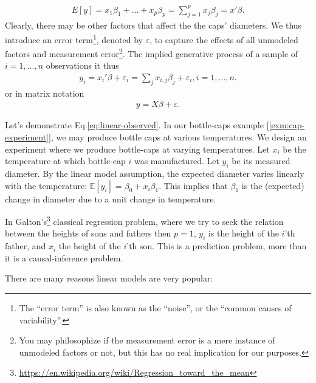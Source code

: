 \documentclass[]{book}
\renewcommand{\href}[2]{#2\footnote{\url{#1}}}
\theoremstyle{definition}
\theoremstyle{definition}
\theoremstyle{definition}
\theoremstyle{remark}
\let\BeginKnitrBlock\begin \let\EndKnitrBlock\end
\begin{document}
\begin{align}
  E[y]=x_1 \beta_1 + \dots + x_p \beta_p = \sum_{j=1}^p x_j \beta_j = x'\beta .
  \label{eq:linear-mean}
\end{align}
Clearly, there may be other factors that affect the the caps' diameters.
We thus introduce an error term\footnote{The ``error term'' is also known as the ``noise'', or the ``common causes of variability''.}, denoted by \(\varepsilon\), to capture the effects of all unmodeled factors and measurement error\footnote{You may philosophize if the measurement error is a mere instance of unmodeled factors or not, but this has no real implication for our purposes.}.
The implied generative process of a sample of \(i=1,\dots,n\) observations it thus
\begin{align}
  y_i = x_i'\beta + \varepsilon_i = \sum_j x_{i,j} \beta_j + \varepsilon_i , i=1,\dots,n .
  \label{eq:linear-observed}
\end{align}
or in matrix notation
\begin{align}
  y = X \beta + \varepsilon .
  \label{eq:linear-matrix}
\end{align}

Let's demonstrate Eq.\eqref{eq:linear-observed}.
In our bottle-caps example {[}\ref{exm:cap-experiment}{]}, we may produce bottle caps at various temperatures.
We design an experiment where we produce bottle-caps at varying temperatures.
Let \(x_i\) be the temperature at which bottle-cap \(i\) was manufactured.
Let \(y_i\) be its measured diameter.
By the linear model assumption, the expected diameter varies linearly with the temperature: \(\mathbb{E}[y_i]=\beta_0 + x_i \beta_1\).
This implies that \(\beta_1\) is the (expected) change in diameter due to a unit change in temperature.

\BeginKnitrBlock{remark}
{}In \href{https://en.wikipedia.org/wiki/Regression_toward_the_mean}{Galton's} classical regression problem, where we try to seek the relation between the heights of sons and fathers then \(p=1\), \(y_i\) is the height of the \(i\)'th father, and \(x_i\) the height of the \(i\)'th son.
This is a prediction problem, more than it is a causal-inference problem.
\EndKnitrBlock{remark}

There are many reasons linear models are very popular:
\end{document}
